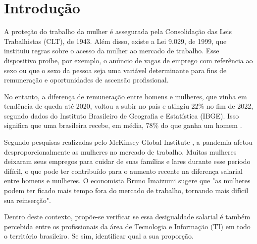 \section{Introdução}

A proteção do trabalho da mulher é assegurada pela Consolidação das Leis Trabalhistas (CLT), de 1943. Além disso, existe a Lei 9.029, de 1999, que instituiu regras sobre o acesso da mulher ao mercado de trabalho. Esse dispositivo proíbe, por exemplo, o anúncio de vagas de emprego com referência ao sexo ou que o sexo da pessoa seja uma variável determinante para fins de remuneração e oportunidades de ascensão profissional. 

No entanto, a diferença de remuneração entre homens e mulheres, que vinha em tendência de queda até 2020, voltou a subir no país e atingiu 22\% no fim de 2022, segundo dados do Instituto Brasileiro de Geografia e Estatística (IBGE). Isso significa que uma brasileira recebe, em média, 78\% do que ganha um homem \cite{dif_salarial_CNN}.

Segundo pesquisas realizadas pelo McKinsey Global Institute  \cite{covid_affeted_gender}, a pandemia afetou desproporcionalmente as mulheres no mercado de trabalho. Muitas mulheres deixaram seus empregos para cuidar de suas famílias e lares durante esse período difícil, o que pode ter contribuído para o aumento recente na diferença salarial entre homens e mulheres. O economista Bruno Imaizumi sugere que "as mulheres podem ter ficado mais tempo fora do mercado de trabalho, tornando mais difícil sua reinserção".

Dentro deste contexto, propõe-se verificar se essa desigualdade salarial é também percebida entre os profissionais da área de Tecnologia e Informação (TI) em todo o território brasileiro. Se sim, identificar qual a sua proporção.

